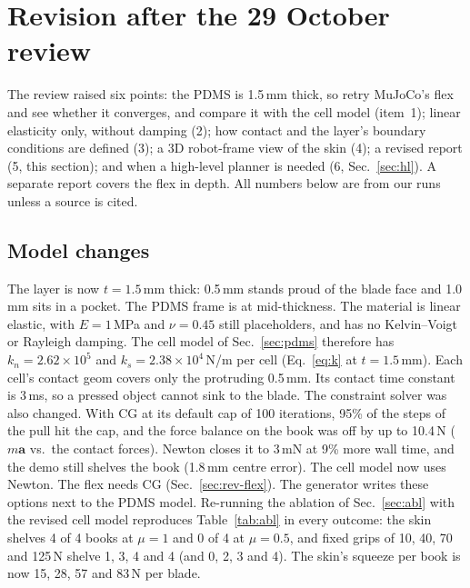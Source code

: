 \documentclass[10pt,twocolumn]{article}
\begin{document}
\section{Revision after the 29 October review}\label{sec:rev}
The review raised six points: the PDMS is 1.5\,mm thick, so retry MuJoCo's flex and see whether it converges, and
compare it with the cell model (item~1); linear elasticity only, without damping (2); how contact and the layer's
boundary conditions are defined (3); a 3D robot-frame view of the skin (4); a revised report (5, this section); and
when a high-level planner is needed (6, Sec.~\ref{sec:hl}). A separate report \cite{flexstudy} covers the flex in
depth. All numbers below are from our runs unless a source is cited.

\subsection{Model changes}\label{sec:rev-model}
The layer is now $t=1.5$\,mm thick: 0.5\,mm stands proud of the blade face and 1.0\,mm sits in a pocket. The
PDMS frame is at mid-thickness. The material is linear elastic, with $E=1$\,MPa and $\nu=0.45$ still placeholders,
and has no Kelvin--Voigt or Rayleigh damping. The cell model of Sec.~\ref{sec:pdms} therefore has
$k_n=2.62\times10^5$ and $k_s=2.38\times10^4$\,N/m per cell (Eq.~\ref{eq:k} at $t=1.5$\,mm). Each cell's contact
geom covers only the protruding 0.5\,mm. Its contact time constant is 3\,ms, so a pressed object cannot sink to
the blade.
The constraint solver was also changed. With CG at its default cap of 100 iterations, 95\% of the steps of the
pull hit the cap, and the force balance on the book was off by up to 10.4\,N ($m\mathbf a$ vs.\ the contact
forces). Newton closes it to 3\,mN at 9\% more wall time, and the demo still shelves the book (1.8\,mm centre
error). The cell model now uses Newton. The flex needs CG (Sec.~\ref{sec:rev-flex}). The generator writes these
options next to the PDMS model. Re-running the ablation of Sec.~\ref{sec:abl} with the revised cell model reproduces Table~\ref{tab:abl} in every
outcome: the skin shelves 4 of 4 books at $\mu=1$ and 0 of 4 at $\mu=0.5$, and fixed grips of 10, 40, 70 and
125\,N shelve 1, 3, 4 and 4 (and 0, 2, 3 and 4). The skin's squeeze per book is now 15, 28, 57 and 83\,N per blade.
\end{document}
